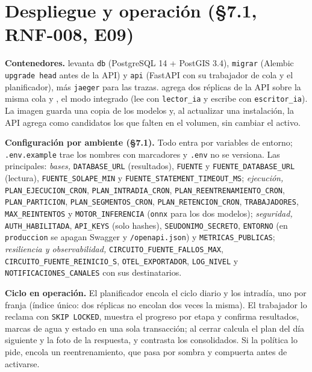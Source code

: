 \documentclass[10pt,a4paper]{article}
\begin{document}
\section{Despliegue y operación (§7.1, RNF-008, E09)}
\label{sec:despliegue}
\textbf{Contenedores.}  levanta \texttt{db} (PostgreSQL 14 + PostGIS 3.4),
\texttt{migrar} (Alembic \texttt{upgrade head} antes de la API) y \texttt{api} (FastAPI con su trabajador de cola y el
planificador), más \texttt{jaeger} para las trazas.  agrega dos réplicas de la API
sobre la misma cola y , el modo integrado (lee con \texttt{lector\_ia} y escribe
con \texttt{escritor\_ia}). La imagen guarda una copia de los modelos y, al actualizar una instalación, la API agrega
como candidatos los que falten en el volumen, sin cambiar el activo.

{\sloppy\textbf{Configuración por ambiente (§7.1).} Todo entra por variables de entorno; \texttt{.env.example} trae los
nombres con marcadores y \texttt{.env} no se versiona. Las principales: \emph{bases,} \texttt{DATABASE\_URL} (resultados), \texttt{FUENTE} y
\texttt{FUENTE\_DATABASE\_URL} (lectura), \texttt{FUENTE\_SOLAPE\_MIN} y \texttt{FUENTE\_STATEMENT\_TIMEOUT\_MS};
\emph{ejecución,} \texttt{PLAN\_EJECUCION\_CRON}, \texttt{PLAN\_INTRADIA\_CRON}, \texttt{PLAN\_REENTRENAMIENTO\_CRON},
\texttt{PLAN\_PARTICION}, \texttt{PLAN\_SEGMENTOS\_CRON}, \texttt{PLAN\_RETENCION\_CRON}, \texttt{TRABAJADORES},
\texttt{MAX\_REINTENTOS} y \texttt{MOTOR\_INFERENCIA} (\texttt{onnx} para los dos modelos); \emph{seguridad,} \texttt{AUTH\_HABILITADA},
\texttt{API\_KEYS} (solo hashes), \texttt{SEUDONIMO\_SECRETO}, \texttt{ENTORNO} (en \texttt{produccion} se apagan
Swagger y \texttt{/openapi.json}) y \texttt{METRICAS\_PUBLICAS}; \emph{resiliencia y observabilidad,}
\texttt{CIRCUITO\_FUENTE\_FALLOS\_MAX}, \texttt{CIRCUITO\_FUENTE\_REINICIO\_S}, \texttt{OTEL\_EXPORTADOR},
\texttt{LOG\_NIVEL} y \texttt{NOTIFICACIONES\_CANALES} con sus destinatarios.\par}

\textbf{Ciclo en operación.} El planificador encola el ciclo diario y los intradía, uno por franja (índice único: dos
réplicas no encolan dos veces la misma). El trabajador lo reclama con \texttt{SKIP LOCKED}, muestra el progreso por
etapa y confirma resultados, marcas de agua y estado en una sola transacción; al cerrar calcula el plan del día
siguiente y la foto de la respuesta, y contrasta los consolidados. Si la política lo pide, encola un reentrenamiento,
que pasa por sombra y compuerta antes de activarse.
\end{document}
